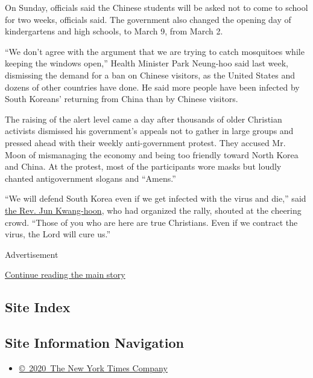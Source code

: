 On Sunday, officials said the Chinese students will be asked not to come
to school for two weeks, officials said. The government also changed the
opening day of kindergartens and high schools, to March 9, from March 2.

``We don't agree with the argument that we are trying to catch
mosquitoes while keeping the windows open,'' Health Minister Park
Neung-hoo said last week, dismissing the demand for a ban on Chinese
visitors, as the United States and dozens of other countries have done.
He said more people have been infected by South Koreans' returning from
China than by Chinese visitors.

The raising of the alert level came a day after thousands of older
Christian activists dismissed his government's appeals not to gather in
large groups and pressed ahead with their weekly anti-government
protest. They accused Mr. Moon of mismanaging the economy and being too
friendly toward North Korea and China. At the protest, most of the
participants wore masks but loudly chanted antigovernment slogans and
``Amens.''

``We will defend South Korea even if we get infected with the virus and
die,'' said
\href{https://www.nytimes3xbfgragh.onion/2019/11/08/world/asia/jun-kwang-hoon-pastor-.html}{the
Rev. Jun Kwang-hoon}, who had organized the rally, shouted at the
cheering crowd. ``Those of you who are here are true Christians. Even if
we contract the virus, the Lord will cure us.''

Advertisement

\protect\hyperlink{after-bottom}{Continue reading the main story}

\hypertarget{site-index}{%
\subsection{Site Index}\label{site-index}}

\hypertarget{site-information-navigation}{%
\subsection{Site Information
Navigation}\label{site-information-navigation}}

\begin{itemize}
\tightlist
\item
  \href{https://help.nytimes3xbfgragh.onion/hc/en-us/articles/115014792127-Copyright-notice}{©~2020~The
  New York Times Company}
\end{itemize}

